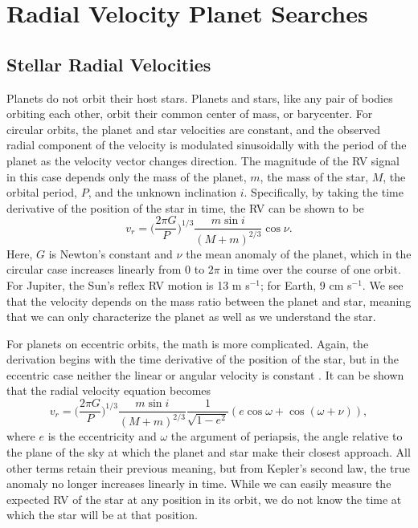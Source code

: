 \section{Radial Velocity Planet Searches}
\subsection{Stellar Radial Velocities}
Planets do not orbit their host stars.
Planets and stars, like any pair of bodies orbiting each other, orbit their common
center of mass, or barycenter.
For circular orbits, the planet and star velocities are constant, and the observed
radial component of the velocity is modulated sinusoidally with the period of the planet
as the velocity vector changes direction.
The magnitude of the RV signal in this case depends only the mass of the planet, $m$, 
the mass of the star, $M$, the orbital period, $P$, and the unknown inclination $i$.
Specifically, by taking the time derivative of the position of the star in time,
the RV can be shown to be
\begin{equation}
v_r = \bigg(\frac{2\pi G}{P}\bigg)^{1/3} \frac{m \sin i}{(M+m)^{2/3}} \cos{\nu}.
\end{equation}
Here, $G$ is Newton's constant and $\nu$ the mean anomaly of the planet, which in the circular case increases
linearly from $0$ to $2\pi$ in time over the course of one orbit.
For Jupiter, the Sun's reflex RV motion is 13 m s$^{-1}$; for Earth, 9 cm s$^{-1}$.
We see that the velocity depends on the mass ratio between the planet and star, meaning
that we can only characterize the planet as well as we understand the star.

For planets on eccentric orbits, the math is more complicated.
Again, the derivation begins with the time derivative of the position of the star, but
in the eccentric case neither the linear or angular velocity is constant \citep{Kepler09}.
It can be shown that the radial velocity equation becomes
\begin{equation}
v_r = \bigg(\frac{2\pi G}{P}\bigg)^{1/3} \frac{m \sin i}{(M+m)^{2/3}} \frac{1}{\sqrt{1-e^2}}
(e \cos \omega + \cos(\omega + \nu)),
\label{eq:rv}
\end{equation}
where $e$ is the eccentricity and $\omega$ the argument of periapsis, the angle relative
to the plane of the sky at which the planet and star make their closest approach.
All other terms retain their previous meaning, but from Kepler's second law, the true anomaly 
no longer increases linearly in time.
While we can easily measure the expected RV of the star at any position in its 
orbit, we do not know the time at which the star will be at that position.

